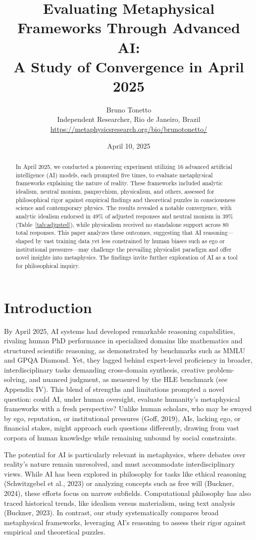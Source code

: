 \documentclass[11pt]{article}
\title{Evaluating Metaphysical Frameworks Through Advanced AI: \\ A Study of Convergence in April 2025}
\author{Bruno Tonetto\\
Independent Researcher, Rio de Janeiro, Brazil\\
\url{https://metaphysicsresearch.org/bio/brunotonetto/}}
\date{April 10, 2025}
\begin{document}
\maketitle

\begin{abstract}
In April 2025, we conducted a pioneering experiment utilizing 16 advanced artificial intelligence (AI) models, each prompted five times, to evaluate metaphysical frameworks explaining the nature of reality. These frameworks included analytic idealism, neutral monism, panpsychism, physicalism, and others, assessed for philosophical rigor against empirical findings and theoretical puzzles in consciousness science and contemporary physics. The results revealed a notable convergence, with analytic idealism endorsed in 49\% of adjusted responses and neutral monism in 39\% (Table~\ref{tab:adjusted}), while physicalism received no standalone support across 80 total responses. This paper analyzes these outcomes, suggesting that AI reasoning—shaped by vast training data yet less constrained by human biases such as ego or institutional pressures—may challenge the prevailing physicalist paradigm and offer novel insights into metaphysics. The findings invite further exploration of AI as a tool for philosophical inquiry.
\end{abstract}

\section{Introduction}
By April 2025, AI systems had developed remarkable reasoning capabilities, rivaling human PhD performance in specialized domains like mathematics and structured scientific reasoning, as demonstrated by benchmarks such as MMLU and GPQA Diamond. Yet, they lagged behind expert-level proficiency in broader, interdisciplinary tasks demanding cross-domain synthesis, creative problem-solving, and nuanced judgment, as measured by the HLE benchmark (see Appendix IV). This blend of strengths and limitations prompted a novel question: could AI, under human oversight, evaluate humanity’s metaphysical frameworks with a fresh perspective? Unlike human scholars, who may be swayed by ego, reputation, or institutional pressures (Goff, 2019), AIs, lacking ego, or financial stakes, might approach such questions differently, drawing from vast corpora of human knowledge while remaining unbound by social constraints.

The potential for AI is particularly relevant in metaphysics, where debates over reality’s nature remain unresolved, and must accommodate interdisciplinary views. While AI has been explored in philosophy for tasks like ethical reasoning (Schwitzgebel et al., 2023) or analyzing concepts such as free will (Buckner, 2024), these efforts focus on narrow subfields. Computational philosophy has also traced historical trends, like idealism versus materialism, using text analysis (Buckner, 2023). In contrast, our study systematically compares broad metaphysical frameworks, leveraging AI's reasoning to assess their rigor against empirical and theoretical puzzles.
\end{document}
